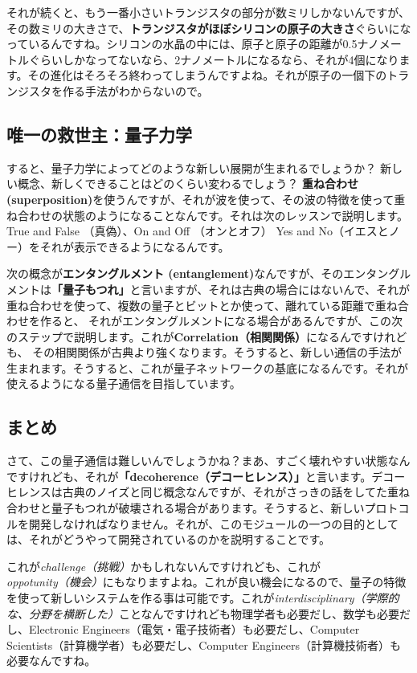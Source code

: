 それが続くと、もう一番小さいトランジスタの部分が数ミリしかないんですが、その数ミリの大きさで、\textbf{トランジスタがほぼシリコンの原子の大きさ}ぐらいになっているんですね。シリコンの水晶の中には、原子と原子の距離が0.5ナノメートルぐらいしかなってないなら、2ナノメートルになるなら、それが4個になります。その進化はそろそろ終わってしまうんですよね。それが原子の一個下のトランジスタを作る手法がわからないので。
\subsection{唯一の救世主：量子力学}
すると、量子力学によってどのような新しい展開が生まれるでしょうか？
新しい概念、新しくできることはどのくらい変わるでしょう？
\textbf{重ね合わせ (superposition)}を使うんですが、それが波を使って、その波の特徴を使って重ね合わせの状態のようになることなんです。それは次のレッスンで説明します。True and False （真偽）、On and Off （オンとオフ）
Yes and No（イエスとノー）をそれが表示できるようになるんです。

次の概念が\textbf{エンタングルメント (entanglement)}なんですが、そのエンタングルメントは\textbf{「量子もつれ」}と言いますが、それは古典の場合にはないんで、それが重ね合わせを使って、複数の量子とビットとか使って、離れている距離で重ね合わせを作ると、
それがエンタングルメントになる場合があるんですが、この次のステップで説明します。これが\textbf{Correlation（相関関係）}になるんですけれども、
その相関関係が古典より強くなります。そうすると、新しい通信の手法が生まれます。そうすると、これが量子ネットワークの基底になるんです。それが使えるようになる量子通信を目指しています。
\subsection{まとめ}
さて、この量子通信は難しいんでしょうかね？まあ、すごく壊れやすい状態なんですけれども、それが\textbf{「decoherence（デコーヒレンス）」}と言います。デコーヒレンスは古典のノイズと同じ概念なんですが、それがさっきの話をしてた重ね合わせと量子もつれが破壊される場合があります。そうすると、新しいプロトコルを開発しなければなりません。それが、このモジュールの一つの目的としては、それがどうやって開発されているのかを説明することです。

これが\emph{challenge（挑戦）}かもしれないんですけれども、これが\emph{oppotunity（機会）}にもなりますよね。これが良い機会になるので、量子の特徴を使って新しいシステムを作る事は可能です。これが\emph{interdisciplinary（学際的な、分野を横断した）}ことなんですけれども物理学者も必要だし、数学も必要だし、Electronic Engineers（電気・電子技術者）も必要だし、Computer　Scientists（計算機学者）も必要だし、Computer Engineers（計算機技術者）も必要なんですね。



